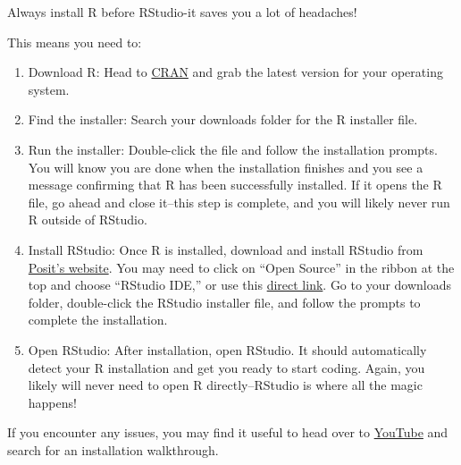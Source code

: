 \documentclass[
  letterpaper,
]{book}
\providecommand{\tightlist}{%
  \setlength{\itemsep}{0pt}\setlength{\parskip}{0pt}}\usepackage{longtable,booktabs,array}
\begin{document}
\begin{tcolorbox}[enhanced jigsaw, colframe=quarto-callout-tip-color-frame, breakable, arc=.35mm, bottomtitle=1mm, bottomrule=.15mm, colbacktitle=quarto-callout-tip-color!10!white, rightrule=.15mm, colback=white, opacityback=0, opacitybacktitle=0.6, coltitle=black, left=2mm, toptitle=1mm, toprule=.15mm, titlerule=0mm, leftrule=.75mm, title=\textcolor{quarto-callout-tip-color}{\faLightbulb}\hspace{0.5em}{Tip from the Helpdesk: First Things First - Installation Order Matters!}]

Always install R before RStudio-it saves you a lot of headaches!

This means you need to:

\begin{enumerate}
\def\labelenumi{\arabic{enumi}.}
\tightlist
\item
  Download R: Head to \href{https://cran.r-project.org/}{CRAN} and grab
  the latest version for your operating system.
\item
  Find the installer: Search your downloads folder for the R installer
  file.
\item
  Run the installer: Double-click the file and follow the installation
  prompts. You will know you are done when the installation finishes and
  you see a message confirming that R has been successfully installed.
  If it opens the R file, go ahead and close it--this step is complete,
  and you will likely never run R outside of RStudio.
\item
  Install RStudio: Once R is installed, download and install RStudio
  from \href{https://posit.co/}{Posit's website}. You may need to click
  on ``Open Source'' in the ribbon at the top and choose ``RStudio
  IDE,'' or use this
  \href{https://posit.co/products/open-source/rstudio/}{direct link}. Go
  to your downloads folder, double-click the RStudio installer file, and
  follow the prompts to complete the installation.
\item
  Open RStudio: After installation, open RStudio. It should
  automatically detect your R installation and get you ready to start
  coding. Again, you likely will never need to open R directly--RStudio
  is where all the magic happens!
\end{enumerate}

If you encounter any issues, you may find it useful to head over to
\href{http://www.youtube.com}{YouTube} and search for an installation
walkthrough.

\end{tcolorbox}
\end{document}
